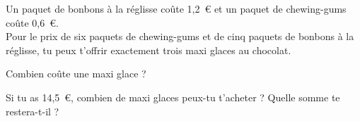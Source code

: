 Un paquet de bonbons à la réglisse coûte 1,2~\textgreek{\euro} et un
paquet de chewing-gums coûte 0,6~\textgreek{\euro}.
\\Pour le prix de six paquets de chewing-gums et de cinq paquets de
bonbons à la réglisse, tu peux t'offrir exactement trois maxi glaces
au chocolat.
\begin{myenumerate}
\item Combien coûte une maxi glace ?
\item Si tu as 14,5~\textgreek{\euro}, combien de maxi glaces peux-tu
t'acheter ? Quelle somme te restera-t-il ?
\end{myenumerate}